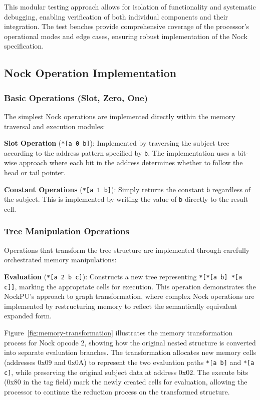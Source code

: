 \documentclass[twoside]{article}
\begin{document}
\noindent
This modular testing approach allows for isolation of functionality and systematic debugging, enabling verification of both individual components and their integration. The test benches provide comprehensive coverage of the processor's operational modes and edge cases, ensuring robust implementation of the Nock specification.

\subsection{Nock Operation Implementation}

\subsubsection{Basic Operations (Slot, Zero, One)}

The simplest Nock operations are implemented directly within the memory traversal and execution modules:

\textbf{Slot Operation} (\texttt{*[a 0 b]}): Implemented by traversing the subject tree according to the address pattern specified by \texttt{b}. The implementation uses a bit-wise approach where each bit in the address determines whether to follow the head or tail pointer.

\textbf{Constant Operations} (\texttt{*[a 1 b]}): Simply returns the constant \texttt{b} regardless of the subject. This is implemented by writing the value of \texttt{b} directly to the result cell.

\subsubsection{Tree Manipulation Operations}

Operations that transform the tree structure are implemented through carefully orchestrated memory manipulations:

\textbf{Evaluation} (\texttt{*[a 2 b c]}): Constructs a new tree representing \texttt{*[*[a b] *[a c]]}, marking the appropriate cells for execution. This operation demonstrates the NockPU's approach to graph transformation, where complex Nock operations are implemented by restructuring memory to reflect the semantically equivalent expanded form.

Figure~\ref{fig:memory-transformation} illustrates the memory transformation process for Nock opcode 2, showing how the original nested structure is converted into separate evaluation branches. The transformation allocates new memory cells (addresses 0x09 and 0x0A) to represent the two evaluation paths \texttt{*[a b]} and \texttt{*[a c]}, while preserving the original subject data at address 0x02. The execute bits (0x80 in the tag field) mark the newly created cells for evaluation, allowing the processor to continue the reduction process on the transformed structure.
\end{document}
